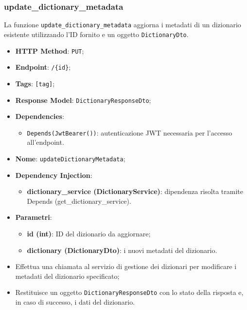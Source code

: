 \subsubsection{update\_dictionary\_metadata}

\par La funzione \texttt{update\_dictionary\_metadata} aggiorna i metadati di un dizionario esistente utilizzando l'ID fornito e un oggetto \texttt{DictionaryDto}.

\begin{itemize}
  \item \textbf{HTTP Method}: \texttt{PUT};
  \item \textbf{Endpoint}: \texttt{/\{id\}};
  \item \textbf{Tags}: \texttt{[tag]};
  \item \textbf{Response Model}: \texttt{DictionaryResponseDto};
  \item \textbf{Dependencies}:
  \begin{itemize}
    \item \texttt{Depends(JwtBearer())}: autenticazione JWT necessaria per l'accesso all'endpoint.
  \end{itemize}
  \item \textbf{Nome}: \texttt{updateDictionaryMetadata};
  \item \textbf{Dependency Injection}:
  \begin{itemize}
    \item \textbf{dictionary\_service (DictionaryService)}: dipendenza risolta tramite Depends (get\_dictionary\_service).
  \end{itemize}
  \item \textbf{Parametri}:
  \begin{itemize}
    \item \textbf{id (int)}: ID del dizionario da aggiornare;
    \item \textbf{dictionary (DictionaryDto)}: i nuovi metadati del dizionario.
  \end{itemize}
\end{itemize}

\begin{itemize}
  \item Effettua una chiamata al servizio di gestione dei dizionari per modificare i metadati del dizionario specificato;
  \item Restituisce un oggetto \texttt{DictionaryResponseDto} con lo stato della risposta e, in caso di successo, i dati del dizionario.
\end{itemize}

